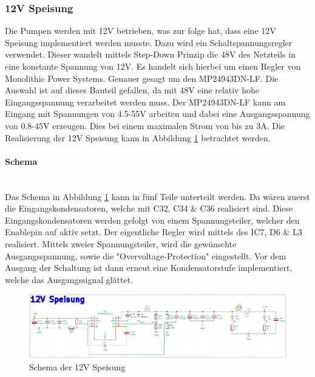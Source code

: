 \subsubsection{12V Speisung}
\label{subsubsec:12V Speisung}

Die Pumpen werden mit 12V betrieben, was zur folge hat, dass eine 12V Speisung implementiert werden musste. Dazu wird ein Schaltspannungsregler verwendet. Dieser wandelt mittels Step-Down Prinzip die 48V des Netzteils in eine konstante Spannung von 12V. Es handelt sich hierbei um einen Regler von Monolithic Power Systems. Genauer gesagt um den MP24943DN-LF. Die Auswahl ist auf dieses Bauteil gefallen, da mit 48V eine relativ hohe Eingangsspannung verarbeitet werden muss. Der MP24943DN-LF kann am Eingang mit Spannungen von 4.5-55V arbeiten und dabei eine Ausgangsspannung von 0.8-45V erzeugen. Dies bei einem maximalen Strom von bis zu 3A. Die Realisierung der 12V Speisung kann in Abbildung \ref{fig:Schema_Speisung_12V} betrachtet werden. \cite{aiyimaindustrial_store_us_nodate} \cite{mouser_mp24943dn-lf_nodate} \cite[S.355-370]{atmel_atmel_2014} \\


\paragraph{Schema}\mbox{}\\

Das Schema in Abbildung \ref{fig:Schema_Speisung_12V} kann in fünf Teile unterteilt werden. Da wären zuerst die Eingangskondensatoren, welche mit C32, C34 \& C36 realisiert sind. Diese Eingangskondensatoren werden gefolgt von einem Spannungsteiler, welcher den Enablepin auf aktiv setzt. Der eigentliche Regler wird mittels des IC7, D6 \& L3 realisiert. Mittels zweier Spannungsteiler, wird die gewünschte Ausgangsspannung, sowie die "Overvoltage-Protection" eingestellt. Vor dem Ausgang der Schaltung ist dann erneut eine Kondensatorstufe implementiert, welche das Ausgangssignal glättet. \cite{mouser_mp24943dn-lf_nodate}

\begin{figure}[h!]
	\centering
	\includegraphics[width=\textwidth]{graphics/Schema_Speisung_12V.png}
	\caption{Schema der 12V Speisung}
	\label{fig:Schema_Speisung_12V}
\end{figure} 

